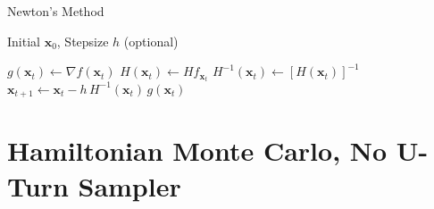 \documentclass{article}
\theoremstyle{remark}
\theoremstyle{definition}
\begin{document}
\begin{algorithm}
\caption{Newton's Method}\label{alg:cap}
\begin{algorithmic}

\Require Initial $\mathbf{x}_0$, Stepsize $h$ (optional)

    \State $g(\mathbf{x}_t) \gets \nabla f(\mathbf{x}_t)$  
    \State $H(\mathbf{x}_t) \gets H f_{\mathbf{x}_t}$ 
    \State $H^{-1} (\mathbf{x}_t) \gets [H(\mathbf{x}_t)]^{-1}$ 
    \State $\mathbf{x}_{t+1} \gets \mathbf{x}_t - h \, H^{-1} (\mathbf{x}_t) \, g(\mathbf{x}_t)$
\EndFor

\end{algorithmic}
\end{algorithm}


\pagebreak 

\section{Hamiltonian Monte Carlo, No U-Turn Sampler}
\end{document}
